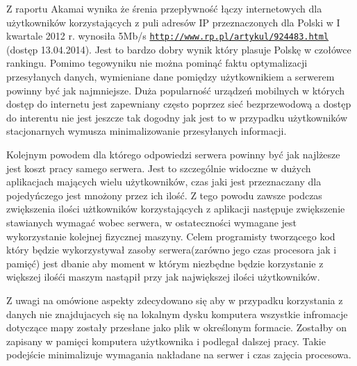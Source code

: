 Z raportu Akamai wynika że śrenia przepływność łączy internetowych dla użytkowników korzystających z puli adresów IP przeznaczonych dla Polski w I kwartale 2012 r. wynosiła 5Mb/s  \underline{\texttt{http://www.rp.pl/artykul/924483.html}} (dostęp 13.04.2014). Jest to bardzo dobry wynik który plasuje Polskę w czołówce rankingu. Pomimo tegowyniku nie można pominąć faktu optymalizacji przesyłanych danych, wymieniane dane pomiędzy użytkownikiem a serwerem powinny być jak najmniejsze. Duża popularność urządzeń mobilnych w których dostęp do internetu jest zapewniany często poprzez sieć bezprzewodową a dostęp do interentu nie jest jeszcze tak dogodny jak jest to w przypadku użytkowników stacjonarnych  wymusza minimalizowanie przesyłanych informacji.

Kolejnym powodem dla którego odpowiedzi serwera powinny być jak najlżesze jest koszt pracy samego serwera. Jest to szczególnie widoczne w dużych aplikacjach mających wielu użytkowników, czas jaki jest przeznaczany dla pojedyńczego jest mnożony przez ich ilość. Z tego powodu zawsze podczas zwiększenia ilości użtkowników korzystających z aplikacji następuje zwiększenie stawianych wymagać wobec serwera, w ostateczności wymagane jest wykorzystanie kolejnej fizycznej maszyny. Celem programisty tworzącego kod który będzie wykorzystywał zasoby serwera(zarówno jego czas procesora jak i pamięć) jest dbanie aby moment w którym niezbędne będzie korzystanie z większej ilośći maszym nastąpił przy jak największej ilości użytkowników.

Z uwagi na omówione aspekty zdecydowano się aby w przypadku korzystania z danych nie znajdujacych się na lokalnym dysku komputera wszystkie infromacje dotyczące mapy zostały przesłane jako plik w określonym formacie. Zostałby on zapisany w pamięci komputera użytkownika i podlegał dalszej pracy. Takie podejście minimalizuje wymagania nakładane na serwer i czas zajęcia procesowa.

\newpage
